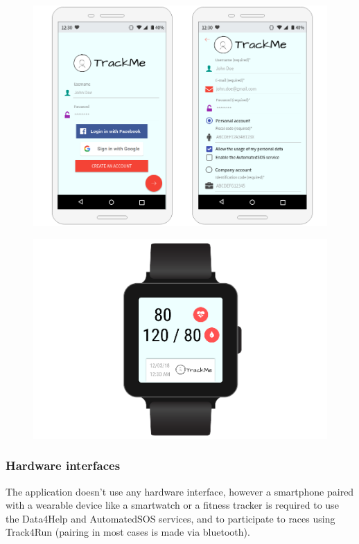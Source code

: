 \clearpage
	
\begin{figure}[h!] \ContinuedFloat
\centering
\includegraphics[scale=0.45]{sections/mockups/mockups7,8.png} \newline
{}
\end{figure}
	
\begin{figure}[h!] \ContinuedFloat
\centering
\includegraphics[scale=0.45]{sections/mockups/mockupWatch.png} \newline
{}
\end{figure}

\subsubsection{Hardware interfaces}
The application doesn't use any hardware interface, however a smartphone paired with a wearable device like a smartwatch or a fitness tracker is required to use the Data4Help and AutomatedSOS services, and to participate to races using Track4Run (pairing in most cases is made via bluetooth).

